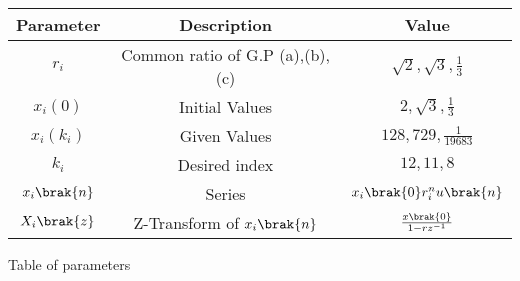 \begin{tabular}{|c|c|c|}
    \hline 
    \textbf{Parameter}&\textbf{Description} &\textbf{Value}\\
    \hline 
    $r_i$ & Common ratio of G.P (a),(b),(c) & $\sqrt{2}, \sqrt{3}, \frac{1}{3}$ \\
    \hline
    $x_i(0)$ & Initial Values & $2, \sqrt{3}, \frac{1}{3}$ \\
    \hline
    $x_i(k_i)$ & Given Values & $128, 729, \frac{1}{19683}$ \\
    \hline 
    $k_i$ & Desired index & $12, 11, 8$ \\
    \hline 
    $x_i\brak{n}$ & Series & $x_i\brak{0}r_i^nu\brak{n}$ \\
    \hline
	$X_i\brak{z}$ & Z-Transform of $x_i\brak{n}$ & $\frac{x\brak{0}}{1-rz^{-1}}$ \\
    \hline
\end{tabular}

\caption{Table of parameters}
\label{Table:1}

